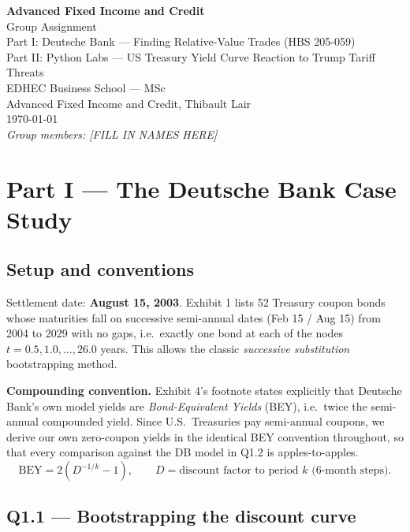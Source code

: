 \documentclass[11pt]{article}
\newcommand{\question}[1]{\subsection*{\textcolor{edhecred}{#1}}}
\begin{document}
\begin{titlepage}
\centering
\vspace*{2cm}
{\LARGE\bfseries\color{edhecred} Advanced Fixed Income and Credit}\\[0.4cm]
{\Large Group Assignment}\\[1.2cm]
{\large Part I: Deutsche Bank --- Finding Relative-Value Trades (HBS 205-059)}\\
{\large Part II: Python Labs --- US Treasury Yield Curve Reaction to Trump Tariff Threats}\\[2cm]
{\large EDHEC Business School --- MSc\\ Advanced Fixed Income and Credit, Thibault Lair}\\[2cm]
{\large \today}\\[1cm]
\vfill
{\small \textit{Group members: [FILL IN NAMES HERE]}}
\end{titlepage}

\tableofcontents
\newpage

\section{Part I --- The Deutsche Bank Case Study}

\subsection*{Setup and conventions}
Settlement date: \textbf{August 15, 2003}. Exhibit 1 lists 52 Treasury coupon
bonds whose maturities fall on successive semi-annual dates (Feb 15 / Aug 15)
from 2004 to 2029 with no gaps, i.e.\ exactly one bond at each of the nodes
$t=0.5,1.0,\dots,26.0$ years. This allows the classic \emph{successive
substitution} bootstrapping method.

\textbf{Compounding convention.} Exhibit 4's footnote states explicitly that
Deutsche Bank's own model yields are \emph{Bond-Equivalent Yields} (BEY),
i.e.\ twice the semi-annual compounded yield. Since U.S.\ Treasuries pay
semi-annual coupons, we derive our own zero-coupon yields in the identical
BEY convention throughout, so that every comparison against the DB model in
Q1.2 is apples-to-apples.
$$\text{BEY} = 2\left(D^{-1/k}-1\right), \qquad D = \text{discount factor to period } k \text{ (6-month steps)}.$$

\question{Q1.1 --- Bootstrapping the discount curve}
\end{document}
